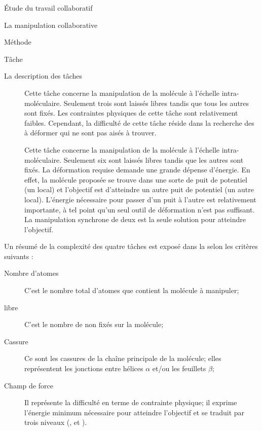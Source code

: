 \documentclass[myfrancais]{mythesis}
\begin{document}
\begin{mypart}{Étude du travail collaboratif}
\begin{mychapter}{La manipulation collaborative}
\begin{mysection}{Méthode}
\begin{mysubsection}{Tâche}
\begin{mysubsubsection}{La description des tâches}
\begin{description}
							\item[]
								Cette tâche concerne la manipulation de la molécule \myTRPZIPPER à l'échelle intra-moléculaire.
								Seulement trois  sont laissés libres tandis que tous les autres sont fixés.
								Les contraintes physiques de cette tâche sont relativement faibles.
								Cependant, la difficulté de cette tâche réside dans la recherche des  à déformer qui ne sont pas aisés à trouver.
							\item[]
								Cette tâche concerne la manipulation de la molécule \myTRPCAGE à l'échelle intra-moléculaire.
								Seulement six  sont laissés libres tandis que les autres sont fixés.
								La déformation requise demande une grande dépense d'énergie.
								En effet, la molécule proposée se trouve dans une sorte de puit de potentiel (un  local) et l'objectif est d'atteindre un autre puit de potentiel (un autre  local).
								L'énergie nécessaire pour passer d'un puit à l'autre est relativement importante, à tel point qu'un seul outil de déformation n'est pas suffisant.
								La manipulation synchrone de deux  est la seule solution pour atteindre l'objectif.
						\end{description}

						Un résumé de la complexité des quatre tâches est exposé dans la  selon les critères suivants :
						\begin{description}
							\item[Nombre d'atomes] C'est le nombre total d'atomes que contient la molécule à manipuler;
							\item[ libre] C'est le nombre de  non fixés sur la molécule;
							\item[Cassure] Ce sont les cassures de la chaîne principale de la molécule; elles représentent les jonctions entre hélices $\alpha$ et/ou les feuillets $\beta$;
							\item[Champ de force] Il représente la difficulté en terme de contrainte physique; il exprime l'énergie minimum nécessaire pour atteindre l'objectif et se traduit par trois niveaux (,  et ).
						\end{description}


\end{mysubsubsection}
\end{mysubsection}
\end{mysection}
\end{mychapter}
\end{mypart}
\end{document}
